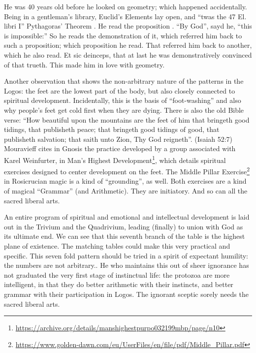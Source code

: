 \begin{quotex}
He was 40 years old before he looked on geometry; which happened accidentally. Being in a gentleman's library, Euclid's Elements lay open, and ``twas the 47 El. libri I'' Pythagoras' Theorem . He read the proposition . ``By God'', sayd he, ``this is impossible:'' So he reads the demonstration of it, which referred him back to such a proposition; which proposition he read. That referred him back to another, which he also read. Et sic deinceps, that at last he was demonstratively convinced of that trueth. This made him in love with geometry.

\end{quotex}


Another observation that shows the non-arbitrary nature of the patterns in the Logos: the feet are the lowest part of the body, but also closely connected to spiritual development. Incidentally, this is the basis of ``foot-washing'' and also why people's feet get cold first when they are dying. There is also the old Bible verse: ``How beautiful upon the mountains are the feet of him that bringeth good tidings, that publisheth peace; that bringeth good tidings of good, that publisheth salvation; that saith unto Zion, Thy God reigneth''. (Isaiah 52:7) Mouravieff cites in Gnosis the practice developed by a group associated with Karel Weinfurter, in Man's Highest Development\footnote{\url{https://archive.org/details/manshighestpurpo032199mbp/page/n10}}, which details spiritual exercises designed to center development on the feet. The Middle Pillar Exercise\footnote{\url{https://www.golden-dawn.com/eu/UserFiles/en/file/pdf/Middle\_Pillar.pdf}} in Rosicrucian magic is a kind of ``grounding'', as well. Both exercises are a kind of magical ``Grammar'' (and Arithmetic). They are initiatory. And so can all the sacred liberal arts.

An entire program of spiritual and emotional and intellectual development is laid out in the Trivium and the Quadrivium, leading (finally) to union with God as its ultimate end. We can see that this seventh branch of the table is the highest plane of existence. The matching tables could make this very practical and specific. This seven fold pattern should be tried in a spirit of expectant humility: the numbers are not arbitrary.. He who maintains this out of sheer ignorance has not graduated the very first stage of instinctual life: the protozoa are more intelligent, in that they do better arithmetic with their instincts, and better grammar with their participation in Logos. The ignorant sceptic sorely needs the sacred liberal arts.

